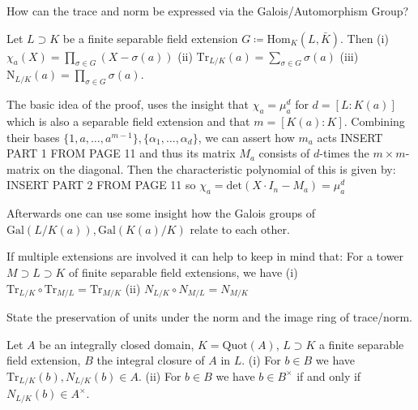 How can the trace and norm be expressed via the Galois/Automorphism Group?

Let \(L \supset K\) be a finite separable field extension \( G \coloneqq \text{Hom}_K(L, \bar{K}) \). 
Then
(i) \(\chi_a(X) = \prod_{\sigma \in G} (X - \sigma(a))\)
(ii) \(\text{Tr}_{L/K}(a) = \sum_{\sigma \in G} \sigma(a)\)
(iii) \(\text{N}_{L/K}(a) = \prod_{\sigma \in G} \sigma(a)\).

The basic idea of the proof, uses the insight that \( \chi_a = \mu_a^d \) for \( d = [L : K(a)] \)
which is also a separable field extension and that \( m = [K(a): K] \). Combining their bases
\( \{1, a, \dots, a^{m-1}\}, \{\alpha_1, \dots, \alpha_d\} \), we can assert how \( m_a \) acts
INSERT PART 1 FROM PAGE 11
and thus its matrix \( M_a \) consists of \( d \)-times the \( m\times m \)-matrix on the diagonal.
Then the characteristic polynomial of this is given by:
INSERT PART 2 FROM PAGE 11
so \(\chi_a = \text{det}(X \cdot I_n - M_a) = \mu_a^d\)

Afterwards one can use some insight how the Galois groups of \( \text{Gal}(L/K(a)), \text{Gal}(K(a)/K)\) 
relate to each other.

If multiple extensions are involved it can help to keep in mind that:
For a tower \(M \supset L \supset K\) of finite separable field extensions, we have
(i) \(\text{Tr}_{L/K} \circ \text{Tr}_{M/L} = \text{Tr}_{M/K}\)
(ii) \(N_{L/K} \circ N_{M/L} = N_{M/K}\) 

State the preservation of units under the norm and the image ring of trace/norm.

Let \(A\) be an integrally closed domain, \(K = \text{Quot}(A)\), \(L \supset K\) a finite separable field extension, 
\(B\) the integral closure of \(A\) in \(L\).
(i) For \(b \in B\) we have \(\text{Tr}_{L/K}(b), N_{L/K}(b) \in A\).
(ii) For \(b \in B\) we have \(b \in B^\times\) if and only if \(N_{L/K}(b) \in A^\times\).




